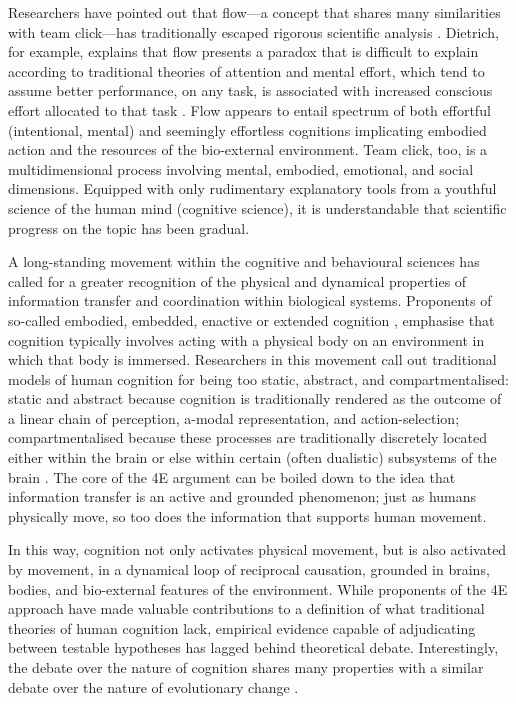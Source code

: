 \begin{CJK}{UTF8}{gbsn}
Researchers have pointed out that flow---a concept that shares many similarities with team click---has traditionally escaped rigorous scientific analysis \citep{Dietrich2010a,Slingerland2014}.  Dietrich, for example, explains that flow presents a paradox that is difficult to explain according to traditional theories of attention and mental effort, which tend to assume better performance, on any task, is associated with increased conscious effort allocated to that task \citep{Dietrich2004b}.  Flow appears to entail spectrum of both effortful (intentional, mental) and seemingly effortless cognitions implicating embodied action and the resources of the bio-external environment.  Team click, too, is a multidimensional process involving mental, embodied, emotional, and social dimensions.  Equipped with only rudimentary explanatory tools from a youthful science of the human mind (cognitive science), it is understandable that scientific progress on the topic has been gradual.

A long-standing movement within the cognitive and behavioural sciences has called for a greater recognition of the physical and dynamical properties of information transfer and coordination within biological systems.  Proponents of so-called embodied, embedded, enactive or extended cognition \citep[now collectively referred to as ``4E cognition,'' see][]{Menary2010}, emphasise that cognition typically involves acting with a physical body on an environment in which that body is immersed.  Researchers in this movement call out traditional models of human cognition for being too static, abstract, and compartmentalised: static and abstract because cognition is traditionally rendered as the outcome of a linear chain of perception, a-modal representation, and action-selection; compartmentalised because these processes are traditionally discretely located either within the brain or else within certain (often dualistic) subsystems of the brain \citep[e.g., emotional and cognitive, System 1 (fast) and System 2 (slow), implicit and explicit, and so on; cf.][]{Dienes1999,Evans2003,Kahneman2011}.  The core of the 4E argument can be boiled down to the idea that information transfer is an active and grounded phenomenon; just as humans physically move, so too does the information that supports human movement.

In this way, cognition not only activates physical movement, but is also activated by movement, in a dynamical loop of reciprocal causation, grounded in brains, bodies, and bio-external features of the environment.  While proponents of the 4E approach have made valuable contributions to a definition of what traditional theories of human cognition lack, empirical evidence capable of adjudicating between testable hypotheses has lagged behind theoretical debate.  Interestingly, the debate over the nature of cognition shares many properties with a similar debate over the nature of evolutionary change \citep[discussed in more detail in the General Discussion of this dissertation, see][]{Nowak2010,Scott-Phillips2011,Laland2014,Fuentes2016}.


\end{CJK}
